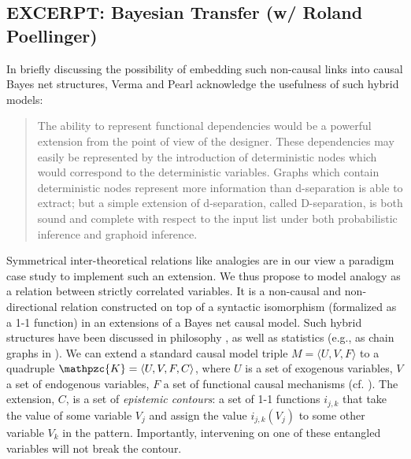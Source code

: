 \documentclass[11pt, oneside]{article}   	%
\begin{document}
\subsection{EXCERPT: Bayesian Transfer (w/ Roland Poellinger)}

In briefly discussing the possibility of embedding such non-causal links into causal Bayes net structures, Verma and Pearl acknowledge the usefulness of such hybrid models:

\begin{quote}
The ability to represent functional dependencies would be a powerful extension from the point of view of the designer. These dependencies may easily be represented by the introduction of deterministic nodes which would correspond to the deterministic variables. Graphs which contain deterministic nodes represent more information than d-separation is able to extract; but a simple extension of d-separation, called D-separation, is both sound and complete with respect to the input list under both probabilistic inference and graphoid inference.  \cite[p. 75]{VermaPearlCausalNetworks1988} %
%
\end{quote}

Symmetrical inter-theoretical relations like analogies are in our view a paradigm case study to implement such an extension.  We thus propose to model analogy as a relation between strictly correlated variables. It is  a non-causal and non-directional relation constructed on top of a syntactic isomorphism (formalized as a 1-1 function) in an extensions of a Bayes net causal model. Such hybrid structures have been discussed in philosophy  \citep{Poellinger2012}, as well as statistics (e.g., as chain graphs in \cite{Lauritzen01}).  We can extend a standard causal model triple $M=\langle U, V, F\rangle$ to a quadruple $\mathpzc{K}=\langle U, V, F, C\rangle$, where $U$ is a set of exogenous variables, $V$ a set of endogenous variables, $F$ a set of functional causal mechanisms (cf.  \cite[def. 7.1.1, p. 203]{Pearl2000}). The extension, $C$, is a set of \emph{epistemic contours}: a set of 1-1 functions $i_{j,k}$ that take the value of some variable $V_j$ and assign the value $i_{j,k}(V_j)$ to some other variable $V_k$ in the pattern. Importantly, intervening on one of these entangled variables will not break the contour.
\end{document}
